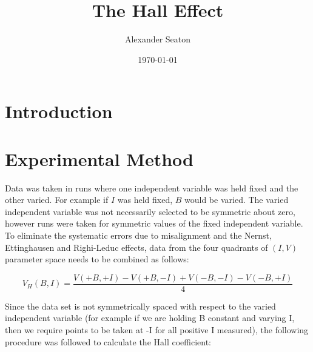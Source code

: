 \documentclass{article}
\title{The Hall Effect}
\date{\today}
\author{Alexander Seaton}
\begin{document}
	\maketitle
	\begin{abstract}
		
	\end{abstract}
	\section{Introduction}
	
	\section{Experimental Method}
		Data was taken in runs where one independent variable was held fixed and the other varied. For example if $I$ was held fixed, $B$ would be varied. The varied independent variable was not necessarily selected to be symmetric about zero, however runs were taken for symmetric values of the fixed independent variable. To eliminate the systematic errors due to misalignment and the Nernst, Ettinghausen and Righi-Leduc effects, data from the four quadrants of $(I,V)$ parameter space needs to be combined as follows:
		
		\begin{equation} \label{eq:removeErrors}
			V_H(B,I) = \frac{V(+B,+I)-V(+B,-I)+V(-B,-I)-V(-B,+I)}{4}
		\end{equation}
		
		\noindent Since the data set is not symmetrically spaced with respect to the varied independent variable (for example if we are holding B constant and varying I, then we require points to be taken at -I for all positive I measured), the following procedure was followed to calculate the Hall coefficient:
		
\end{document}
